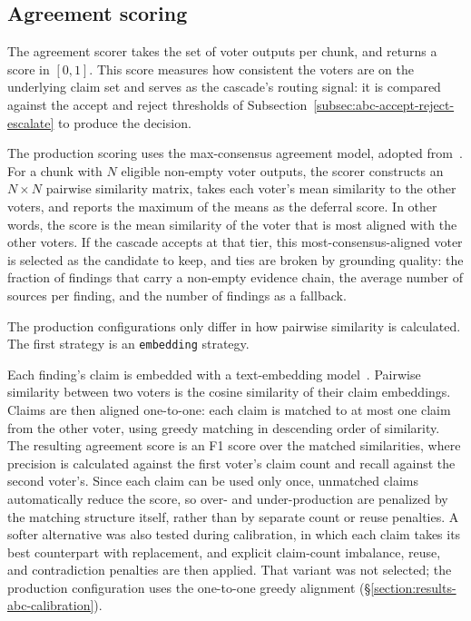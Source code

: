 \subsection{Agreement scoring}\label{subsec:abc-agreement-scoring}

The agreement scorer takes the set of voter outputs per chunk, and returns a score in $[0,1]$. This score measures how consistent the voters are on the underlying claim set and serves as the cascade's routing signal: it is compared against the accept and reject thresholds of Subsection~\ref{subsec:abc-accept-reject-escalate} to produce the decision.

The production scoring uses the max-consensus agreement model, adopted from~\parencite{soiffer2025semantic}. For a chunk with $N$ eligible non-empty voter outputs, the scorer constructs an $N \times N$ pairwise similarity matrix, takes each voter's mean similarity to the other voters, and reports the maximum of the means as the deferral score. In other words, the score is the mean similarity of the voter that is most aligned with the other voters. If the cascade accepts at that tier, this most-consensus-aligned voter is selected as the candidate to keep, and ties are broken by grounding quality: the fraction of findings that carry a non-empty evidence chain, the average number of sources per finding, and the number of findings as a fallback.

The production configurations only differ in how pairwise similarity is calculated. The first strategy is an \texttt{embedding} strategy. 

Each finding's claim is embedded with a text-embedding model~\parencite{reimers2019sbert}. Pairwise similarity between two voters is the cosine similarity of their claim embeddings. Claims are then aligned one-to-one: each claim is matched to at most one claim from the other voter, using greedy matching in descending order of similarity. The resulting agreement score is an F1 score over the matched similarities, where precision is calculated against the first voter's claim count and recall against the second voter's. Since each claim can be used only once, unmatched claims automatically reduce the score, so over- and under-production are penalized by the matching structure itself, rather than by separate count or reuse penalties. A softer alternative was also tested during calibration, in which each claim takes its best counterpart with replacement, and explicit claim-count imbalance, reuse, and contradiction penalties are then applied. That variant was not selected; the production configuration uses the one-to-one greedy alignment (§\ref{section:results-abc-calibration}).

